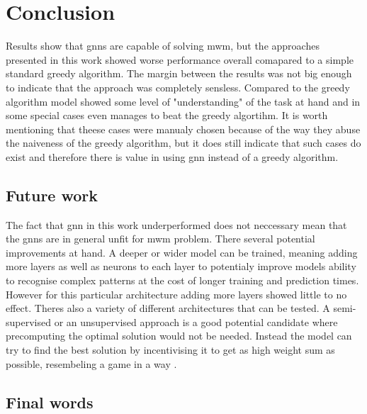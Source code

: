 \chapter{Conclusion}


Results show that \gls{gnn}s are capable of solving \gls{mwm}, but the approaches presented in this work showed worse performance overall comapared to a simple standard greedy algorithm. The margin between the results was not big enough to indicate that the approach was completely sensless. Compared to the greedy algorithm model showed some level of "understanding" of the task at hand and in some special cases even manages to beat the greedy algortihm. It is worth mentioning that theese cases were manualy chosen because of the way they abuse the naiveness of the greedy algorithm, but it does still indicate that such cases do exist and therefore there is value in using \gls{gnn} instead of a greedy algorithm. 

\section{Future work}

The fact that \gls{gnn} in this work underperformed does not neccessary mean that the \gls{gnn}s are in general unfit for \gls{mwm} problem. There several potential improvements at hand. A deeper or wider model can be trained, meaning adding more layers as well as neurons to each layer to potentialy improve models ability to recognise complex patterns at the cost of longer training and prediction times. However for this particular architecture adding more layers showed little to no effect. Theres also a variety of different architectures that can be tested. A semi-supervised or an unsupervised approach is a good potential candidate where precomputing the optimal solution would not be needed. Instead the model can try to find the best solution by incentivising it to get as high weight sum as possible, resembeling a game in a way .

\section{Final words}